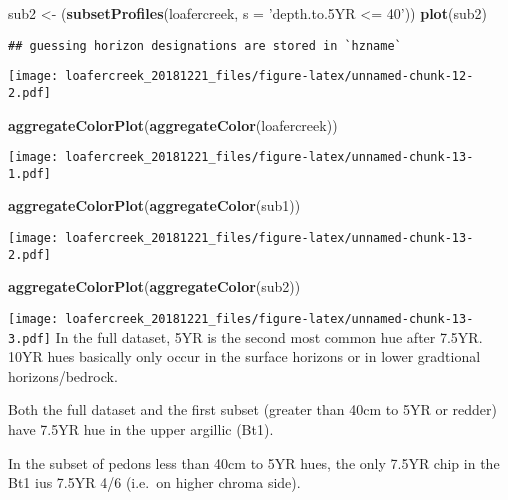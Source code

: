 \documentclass[]{article}
\newenvironment{Shaded}{\begin{snugshade}}{\end{snugshade}}
\newcommand{\KeywordTok}[1]{\textcolor[rgb]{0.13,0.29,0.53}{\textbf{#1}}}
\newcommand{\DataTypeTok}[1]{\textcolor[rgb]{0.13,0.29,0.53}{#1}}
\newcommand{\StringTok}[1]{\textcolor[rgb]{0.31,0.60,0.02}{#1}}
\newcommand{\NormalTok}[1]{#1}
\begin{document}
\begin{Shaded}
\begin{Highlighting}[]
\NormalTok{sub2 <-}\StringTok{ }\NormalTok{(}\KeywordTok{subsetProfiles}\NormalTok{(loafercreek, }\DataTypeTok{s =} \StringTok{'depth.to.5YR <= 40'}\NormalTok{))}
\KeywordTok{plot}\NormalTok{(sub2)}
\end{Highlighting}
\end{Shaded}

\begin{verbatim}
## guessing horizon designations are stored in `hzname`
\end{verbatim}

\texttt{[image: loafercreek\_20181221\_files/figure-latex/unnamed-chunk-12-2.pdf]}

\begin{Shaded}
\begin{Highlighting}[]
\KeywordTok{aggregateColorPlot}\NormalTok{(}\KeywordTok{aggregateColor}\NormalTok{(loafercreek))}
\end{Highlighting}
\end{Shaded}

\texttt{[image: loafercreek\_20181221\_files/figure-latex/unnamed-chunk-13-1.pdf]}

\begin{Shaded}
\begin{Highlighting}[]
\KeywordTok{aggregateColorPlot}\NormalTok{(}\KeywordTok{aggregateColor}\NormalTok{(sub1))}
\end{Highlighting}
\end{Shaded}

\texttt{[image: loafercreek\_20181221\_files/figure-latex/unnamed-chunk-13-2.pdf]}

\begin{Shaded}
\begin{Highlighting}[]
\KeywordTok{aggregateColorPlot}\NormalTok{(}\KeywordTok{aggregateColor}\NormalTok{(sub2))}
\end{Highlighting}
\end{Shaded}

\texttt{[image: loafercreek\_20181221\_files/figure-latex/unnamed-chunk-13-3.pdf]}
In the full dataset, 5YR is the second most common hue after 7.5YR. 10YR
hues basically only occur in the surface horizons or in lower gradtional
horizons/bedrock.

Both the full dataset and the first subset (greater than 40cm to 5YR or
redder) have 7.5YR hue in the upper argillic (Bt1).

In the subset of pedons less than 40cm to 5YR hues, the only 7.5YR chip
in the Bt1 ius 7.5YR 4/6 (i.e.~on higher chroma side).
\end{document}
